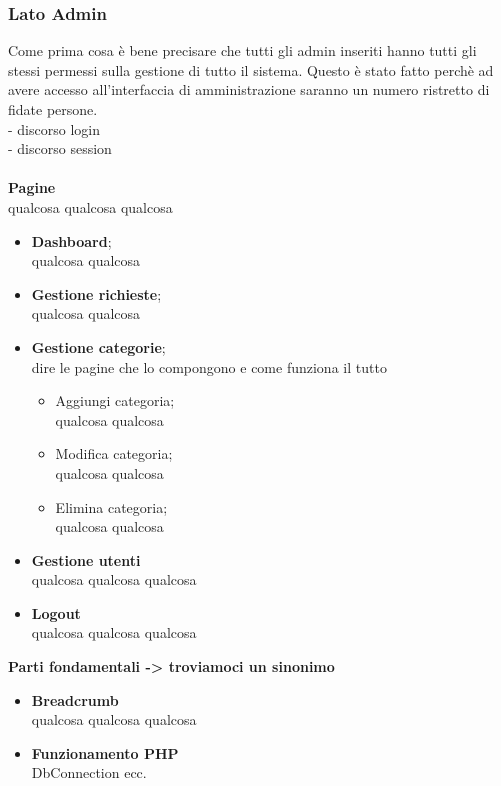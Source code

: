 \subsubsection{Lato Admin}
Come prima cosa è bene precisare che tutti gli admin inseriti hanno tutti gli stessi permessi sulla gestione di tutto il sistema. Questo è stato fatto perchè ad avere accesso all'interfaccia di amministrazione saranno un numero ristretto di fidate persone.\\
- discorso login\\
- discorso session\\\\
\textbf{Pagine}\\ qualcosa qualcosa qualcosa
	\begin{itemize}
		\item \textbf{Dashboard};\\qualcosa qualcosa
		\item \textbf{Gestione richieste};\\qualcosa qualcosa
		\item \textbf{Gestione categorie};\\dire le pagine che lo compongono e come funziona il tutto
	 	\begin{itemize}
 			\item Aggiungi categoria;\\qualcosa qualcosa
 			\item Modifica categoria;\\qualcosa qualcosa
 			\item Elimina categoria;\\qualcosa qualcosa
	 	\end{itemize}
 	\item \textbf{Gestione utenti}\\qualcosa qualcosa qualcosa
 	\item \textbf{Logout}\\qualcosa qualcosa qualcosa\\
 	\end{itemize}
\textbf{Parti fondamentali -> troviamoci un sinonimo} \\
\begin{itemize}
	\item \textbf{Breadcrumb}\\	qualcosa qualcosa qualcosa
	\item \textbf{Funzionamento PHP}\\	DbConnection ecc.
\end{itemize}
